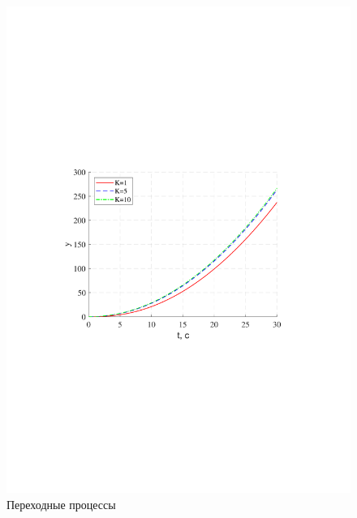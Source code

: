 \documentclass[a4paper,12pt]{article}
\begin{document}
	\begin{figure}[h!]
		\begin{center}
		\renewcommand{\figurename}{Рисунок}
		\includegraphics[width=5in]{ph3ast1MOD.pdf}
		\caption{Переходные процессы} 
		\label{s_14} 
		\end{center}
	\end{figure}
\end{document}
